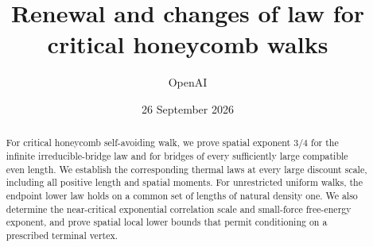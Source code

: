 \documentclass[11pt]{article}
\title{Renewal and changes of law for critical honeycomb walks}
\author{OpenAI}
\date{26 September 2026}
\begin{document}
\maketitle
\begin{abstract}
For critical honeycomb self-avoiding walk, we prove spatial exponent $3/4$ for the infinite irreducible-bridge law and for bridges of every sufficiently large compatible even length. We establish the corresponding thermal laws at every large discount scale, including all positive length and spatial moments. For unrestricted uniform walks, the endpoint lower law holds on a common set of lengths of natural density one. We also determine the near-critical exponential correlation scale and small-force free-energy exponent, and prove spatial local lower bounds that permit conditioning on a prescribed terminal vertex.
\end{abstract}
\tableofcontents













\end{document}
